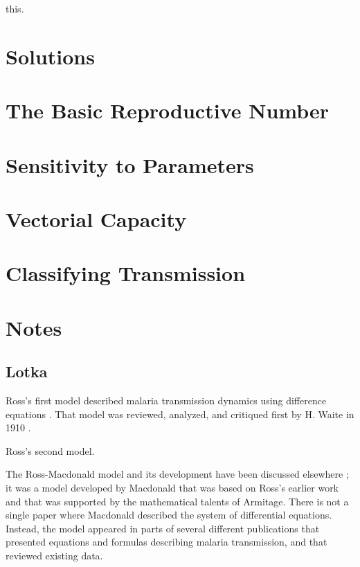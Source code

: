 \documentclass[
]{book}
\begin{document}
this.

\section{Solutions}\label{solutions-1}

\section{The Basic Reproductive Number}\label{the-basic-reproductive-number}

\section{Sensitivity to Parameters}\label{sensitivity-to-parameters}

\section{Vectorial Capacity}\label{vectorial-capacity}

\section{Classifying Transmission}\label{classifying-transmission}

\section{Notes}\label{notes-1}

\subsection{Lotka}\label{lotka}

Ross's first model described malaria transmission dynamics using difference equations \autocite{RossR1908}. That model was reviewed, analyzed, and critiqued first by H. Waite in 1910 \autocite{WaiteH1910MosquitoesMalaria}.

Ross's second model.

The Ross-Macdonald model and its development have been discussed elsewhere \autocite{AronJL1982PopulationDynamics,BaileyNTJ1982BiomathematicsMalaria,SmithDL2012_RossMacdonald}; it was a model developed by Macdonald that was based on Ross's earlier work and that was supported by the mathematical talents of Armitage. There is not a single paper where Macdonald described the system of differential equations. Instead, the model appeared in parts of several different publications that presented equations and formulas describing malaria transmission, and that reviewed existing data.
\end{document}
